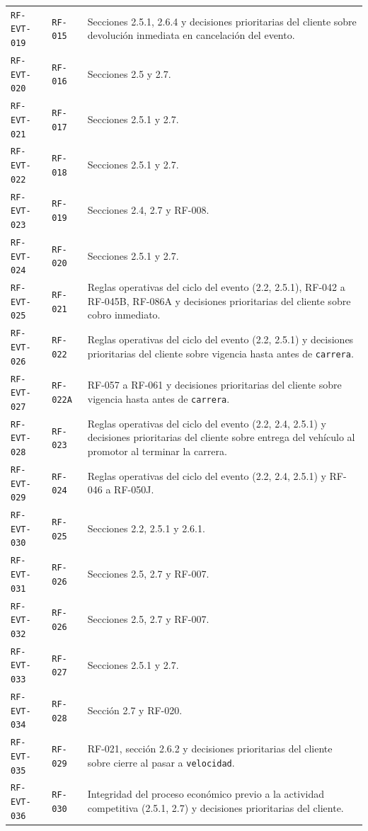\documentclass[10pt,letterpaper]{article}
\begin{document}
\begin{landscape}
\begin{longtable}{P{2.7cm}P{2.6cm}P{15.7cm}}
\texttt{RF-EVT-019} & \texttt{RF-015} & Secciones 2.5.1, 2.6.4 y decisiones prioritarias del cliente sobre devolución inmediata en cancelación del evento.\\
\texttt{RF-EVT-020} & \texttt{RF-016} & Secciones 2.5 y 2.7.\\
\texttt{RF-EVT-021} & \texttt{RF-017} & Secciones 2.5.1 y 2.7.\\
\texttt{RF-EVT-022} & \texttt{RF-018} & Secciones 2.5.1 y 2.7.\\
\texttt{RF-EVT-023} & \texttt{RF-019} & Secciones 2.4, 2.7 y RF-008.\\
\texttt{RF-EVT-024} & \texttt{RF-020} & Secciones 2.5.1 y 2.7.\\
\texttt{RF-EVT-025} & \texttt{RF-021} & Reglas operativas del ciclo del evento (2.2, 2.5.1), RF-042 a RF-045B, RF-086A y decisiones prioritarias del cliente sobre cobro inmediato.\\
\texttt{RF-EVT-026} & \texttt{RF-022} & Reglas operativas del ciclo del evento (2.2, 2.5.1) y decisiones prioritarias del cliente sobre vigencia hasta antes de \texttt{carrera}.\\
\texttt{RF-EVT-027} & \texttt{RF-022A} & RF-057 a RF-061 y decisiones prioritarias del cliente sobre vigencia hasta antes de \texttt{carrera}.\\
\texttt{RF-EVT-028} & \texttt{RF-023} & Reglas operativas del ciclo del evento (2.2, 2.4, 2.5.1) y decisiones prioritarias del cliente sobre entrega del vehículo al promotor al terminar la carrera.\\
\texttt{RF-EVT-029} & \texttt{RF-024} & Reglas operativas del ciclo del evento (2.2, 2.4, 2.5.1) y RF-046 a RF-050J.\\
\texttt{RF-EVT-030} & \texttt{RF-025} & Secciones 2.2, 2.5.1 y 2.6.1.\\
\texttt{RF-EVT-031} & \texttt{RF-026} & Secciones 2.5, 2.7 y RF-007.\\
\texttt{RF-EVT-032} & \texttt{RF-026} & Secciones 2.5, 2.7 y RF-007.\\
\texttt{RF-EVT-033} & \texttt{RF-027} & Secciones 2.5.1 y 2.7.\\
\texttt{RF-EVT-034} & \texttt{RF-028} & Sección 2.7 y RF-020.\\
\texttt{RF-EVT-035} & \texttt{RF-029} & RF-021, sección 2.6.2 y decisiones prioritarias del cliente sobre cierre al pasar a \texttt{velocidad}.\\
\texttt{RF-EVT-036} & \texttt{RF-030} & Integridad del proceso económico previo a la actividad competitiva (2.5.1, 2.7) y decisiones prioritarias del cliente.\\

\end{longtable}
\end{landscape}
\end{document}
